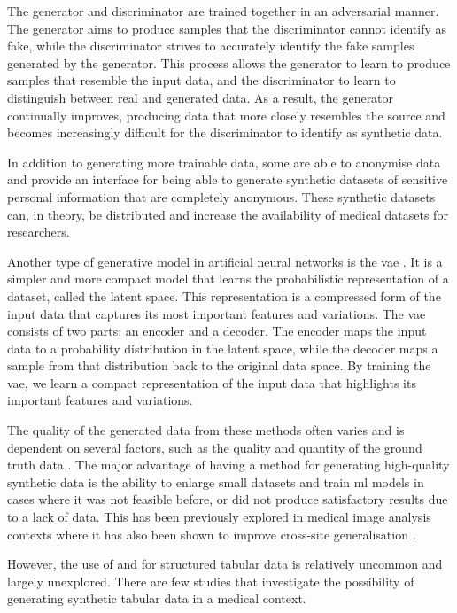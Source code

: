 \documentclass[12pt, a4paper]{article}
\begin{document}
The generator and discriminator are trained together in an adversarial manner. The generator aims to produce samples that the discriminator cannot identify as fake, while the discriminator strives to accurately identify the fake samples generated by the generator. This process allows the generator to learn to produce samples that resemble the input data, and the discriminator to learn to distinguish between real and generated data. As a result, the generator continually improves, producing data that more closely resembles the source and becomes increasingly difficult for the discriminator to identify as synthetic data.

In addition to generating more trainable data, some  are able to anonymise data \cite{liu_ppgan_2019} and provide an interface for being able to generate synthetic datasets of sensitive personal information that are completely anonymous. These synthetic datasets can, in theory, be distributed and increase the availability of medical datasets for researchers.

Another type of generative model in artificial neural networks is the \acrfull{vae} \cite{kingma_auto-encoding_2013}. It is a simpler and more compact model that learns the probabilistic representation of a dataset, called the latent space. This representation is a compressed form of the input data that captures its most important features and variations. The \acrshort{vae} consists of two parts: an encoder and a decoder. The encoder maps the input data to a probability distribution in the latent space, while the decoder maps a sample from that distribution back to the original data space. By training the \acrshort{vae}, we learn a compact representation of the input data that highlights its important features and variations.

The quality of the generated data from these methods often varies and is dependent on several factors, such as the quality and quantity of the ground truth data \cite{karras_training_2020}.  The major advantage of having a method for generating high-quality synthetic data is the ability to enlarge small datasets and train \acrshort{ml}  models in cases where it was not feasible before, or did not produce satisfactory results due to a lack of data. This has been previously explored in medical image analysis contexts where it has also been shown to improve cross-site generalisation \cite{sanaat_robust-deep_2022, bashyam_deep_2022}.

However, the use of  and  for structured tabular data is relatively uncommon and largely unexplored. There are few studies that investigate the possibility of generating synthetic tabular data in a medical context.
\end{document}

